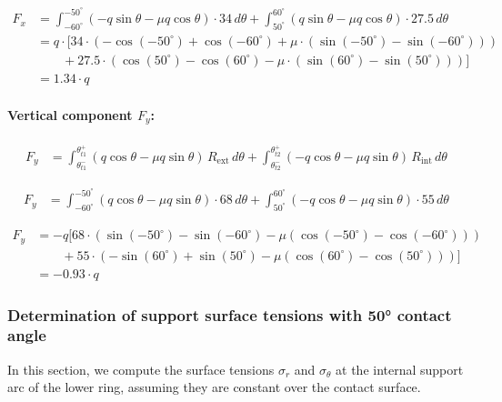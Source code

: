 \documentclass[12pt]{article}
\begin{document}
\begin{align*}
F_x &=
\int_{-60^\circ}^{-50^\circ} (-q \sin\theta - \mu q \cos\theta) \cdot 34 \, d\theta
+
\int_{50^\circ}^{60^\circ} (q \sin\theta - \mu q \cos\theta) \cdot 27.5 \, d\theta \\
&= q \cdot \Big[
34 \cdot \left( -\cos(-50^\circ) + \cos(-60^\circ) + \mu \cdot (\sin(-50^\circ) - \sin(-60^\circ)) \right) \\
&\qquad + 27.5 \cdot \left( \cos(50^\circ) - \cos(60^\circ) - \mu \cdot (\sin(60^\circ) - \sin(50^\circ)) \right)
\Big] \\
&= \boxed{1.34 \cdot q}
\end{align*}


\paragraph{Vertical component \( F_y \):}
\begin{align}
F_y &=
\int_{\theta_{t1}^-}^{\theta_{t1}^+} (q \cos\theta - \mu q \sin\theta) \, R_{\text{ext}} \, d\theta
+
\int_{\theta_{t2}^-}^{\theta_{t2}^+} (-q \cos\theta - \mu q \sin\theta) \, R_{\text{int}} \, d\theta
\tag{2.27}
\end{align}

\begin{align*}
F_y &=
\int_{-60^\circ}^{-50^\circ} (q \cos\theta - \mu q \sin\theta) \cdot 68 \, d\theta
+
\int_{50^\circ}^{60^\circ} (-q \cos\theta - \mu q \sin\theta) \cdot 55 \, d\theta
\end{align*}

\begin{equation}
\begin{aligned}
F_y &= -q \Big[
68 \cdot \left( 
    \sin(-50^\circ) - \sin(-60^\circ)
    - \mu \left( \cos(-50^\circ) - \cos(-60^\circ) \right)
\right) \\
&\qquad + 
55 \cdot \left( 
    -\sin(60^\circ) + \sin(50^\circ)
    - \mu \left( \cos(60^\circ) - \cos(50^\circ) \right)
\right)
\Big] \\
&= \boxed{-0.93 \cdot q}
\end{aligned}
\tag{2.28}
\end{equation}

\subsubsection{Determination of support surface tensions with 50° contact angle}

In this section, we compute the surface tensions $\sigma_r$ and $\sigma_\theta$ at the internal support arc of the lower ring, assuming they are constant over the contact surface.
\end{document}
